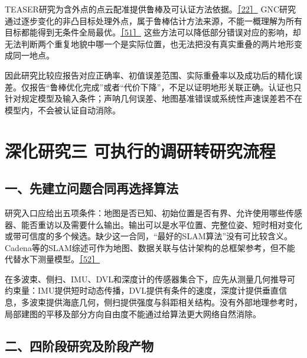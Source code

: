 TEASER研究为含外点的点云配准提供鲁棒及可认证方法依据。\href{https://arxiv.org/abs/2001.07715}{［22］} GNC研究通过逐步变化的非凸目标处理外点，属于鲁棒估计方法来源，不能一概理解为所有目标都能得到无条件全局最优。\href{https://arxiv.org/abs/1909.08605}{［51］} 这些方法可以降低部分错误对应的影响，却无法判断两个重复地貌中哪一个是实际位置，也无法把没有真实重叠的两片地形变成同一地点。

因此研究比较应报告对应正确率、初值误差范围、实际重叠率以及成功后的精化误差。仅报告``鲁棒优化完成''或者``代价下降''，不足以证明地形关联正确。认证也只针对规定模型及输入条件；声呐几何误差、地图基准错误或系统性声速误差若不在模型内，不会被认证自动消除。

\hypertarget{ux6df1ux5316ux7814ux7a76ux4e09-ux53efux6267ux884cux7684ux8c03ux7814ux8f6cux7814ux7a76ux6d41ux7a0b}{%
\section{深化研究三 可执行的调研转研究流程}\label{ux6df1ux5316ux7814ux7a76ux4e09-ux53efux6267ux884cux7684ux8c03ux7814ux8f6cux7814ux7a76ux6d41ux7a0b}}

\hypertarget{ux4e00ux5148ux5efaux7acbux95eeux9898ux5408ux540cux518dux9009ux62e9ux7b97ux6cd5}{%
\subsection{一、先建立问题合同再选择算法}\label{ux4e00ux5148ux5efaux7acbux95eeux9898ux5408ux540cux518dux9009ux62e9ux7b97ux6cd5}}

研究入口应给出五项条件：地图是否已知、初始位置是否有界、允许使用哪些传感器、能否重访以及需要什么输出。输出可以是水平位置、完整位姿、短时相对变化或带可信度的多个候选。缺少这一合同，``最好的SLAM算法''没有可比较含义。Cadena等的SLAM综述可作为地图、数据关联与估计架构的总框架参考，但不能代替水下测量模型。\href{https://arxiv.org/abs/1606.05830}{［52］}

在多波束、侧扫、IMU、DVL和深度计的传感器集合下，应先从测量几何推导可约束量：IMU提供短时动态传播，DVL提供有条件的速度，深度计提供垂直信息，多波束提供海底几何，侧扫提供强度与斜距相关结构。没有外部地理参考时，局部建图的平移及部分方向自由度不能通过给算法更大网络自然消除。

\hypertarget{ux4e8cux56dbux9636ux6bb5ux7814ux7a76ux53caux9636ux6bb5ux4ea7ux7269}{%
\subsection{二、四阶段研究及阶段产物}\label{ux4e8cux56dbux9636ux6bb5ux7814ux7a76ux53caux9636ux6bb5ux4ea7ux7269}}


